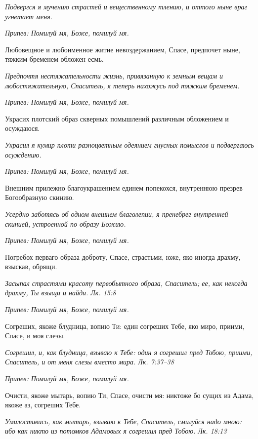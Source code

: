 \itshape Подвергся я мучению страстей и вещественному тлению, и оттого ныне враг угнетает меня.\normalfont{}


\itshape Припев:\normalfont{} Помилуй мя, Боже, помилуй мя.


Любовещное и любоименное житие невоздержанием, Спасе, предпочет ныне, тяжким бременем обложен есмь.


\itshape Предпочтя нестяжательности жизнь, привязанную к земным вещам и любостяжательную, Спаситель, я теперь нахожусь под тяжким бременем.\normalfont{}


\itshape Припев:\normalfont{} Помилуй мя, Боже, помилуй мя.


Украсих плотский образ скверных помышлений различным обложением и осуждаюся.


\itshape Украсил я кумир плоти разноцветным одеянием гнусных помыслов и подвергаюсь осуждению.\normalfont{}


\itshape Припев:\normalfont{} Помилуй мя, Боже, помилуй мя.


Внешним прилежно благоукрашением единем попекохся, внутреннюю презрев Богообразную скинию.


\itshape Усердно заботясь об одном внешнем благолепии, я пренебрег внутренней скинией, устроенной по образу Божию.\normalfont{}


\itshape Припев:\normalfont{} Помилуй мя, Боже, помилуй мя.


Погребох перваго образа доброту, Спасе, страстьми, юже, яко иногда драхму, взыскав, обрящи.


\itshape Засыпал страстями красоту первобытного образа, Спаситель; ее, как некогда драхму, Ты взыщи и найди. Лк. 15:8\normalfont{}


\itshape Припев:\normalfont{} Помилуй мя, Боже, помилуй мя.


Согреших, якоже блудница, вопию Ти: един согреших Тебе, яко миро, приими, Спасе, и моя слезы.


\itshape Согрешил, и, как блудница, взываю к Тебе: один я согрешил пред Тобою, приими, Спаситель, и от меня слезы вместо мира. Лк. 7:37–38\normalfont{}


\itshape Припев:\normalfont{} Помилуй мя, Боже, помилуй мя.


Очисти, якоже мытарь, вопию Ти, Спасе, очисти мя: никтоже бо сущих из Адама, якоже аз, согреших Тебе.


\itshape Умилостивись, как мытарь, взываю к Тебе, Спаситель, смилуйся надо мною: ибо как никто из потомков Адамовых я согрешил пред Тобою. Лк. 18:13\normalfont{}



